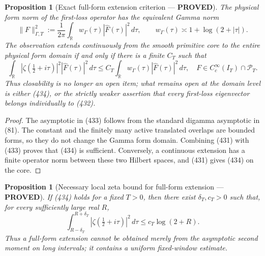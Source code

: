 \documentclass[11pt]{article}
\newtheorem{proposition}[theorem]{Proposition}
\newcommand{\PROVED}{\textcolor{green!45!black}{\textbf{PROVED}}}
\begin{document}
\begin{proposition}[Exact full-form extension criterion --- \PROVED]
The physical form norm of the first-loss operator has the equivalent Gamma
norm
\begin{equation}
 \|F\|_{\Gamma,T}^2
 :=\frac1{2\pi}\int_{\mathbb R}
       w_\Gamma(\tau)|\widehat F(\tau)|^2\,d\tau,
 \qquad
 w_\Gamma(\tau)\asymp 1+\log(2+|\tau|).             \tag{433}
\end{equation}
The observation extends continuously from the smooth primitive core to the
entire physical form domain if and only if there is a finite $C_T$ such that
\begin{equation}
 \boxed{
 \int_{\mathbb R}|\zeta(\tfrac12+i\tau)|^2
          |\widehat F(\tau)|^2\,d\tau
 \le C_T\int_{\mathbb R}w_\Gamma(\tau)
          |\widehat F(\tau)|^2\,d\tau,
 \quad F\in C_c^\infty(I_T)\cap\mathcal P_T.}       \tag{434}
\end{equation}
Thus closability is no longer an open item; what remains open at the domain
level is either (434), or the strictly weaker assertion that every
first-loss eigenvector belongs individually to (432).
\end{proposition}

\begin{proof}
The asymptotic in (433) follows from the standard digamma asymptotic in
(81).  The constant and the finitely many active translated overlaps are
bounded forms, so they do not change the Gamma form domain.  Combining
(431) with (433) proves that (434) is sufficient.  Conversely, a continuous
extension has a finite operator norm between these two Hilbert spaces, and
(431) gives (434) on the core.
\end{proof}

\begin{proposition}[Necessary local zeta bound for full-form extension ---
\PROVED]
If (434) holds for a fixed $T>0$, then there exist
$\delta_T,c_T>0$ such that, for every sufficiently large real $R$,
\begin{equation}
 \boxed{
  \int_{R-\delta_T}^{R+\delta_T}
       |\zeta(\tfrac12+i\tau)|^2\,d\tau
  \le c_T\log(2+R).}                                \tag{435}
\end{equation}
Thus a full-form extension cannot be obtained merely from the asymptotic
second moment on long intervals; it contains a uniform fixed-window
estimate.
\end{proposition}
\end{document}
